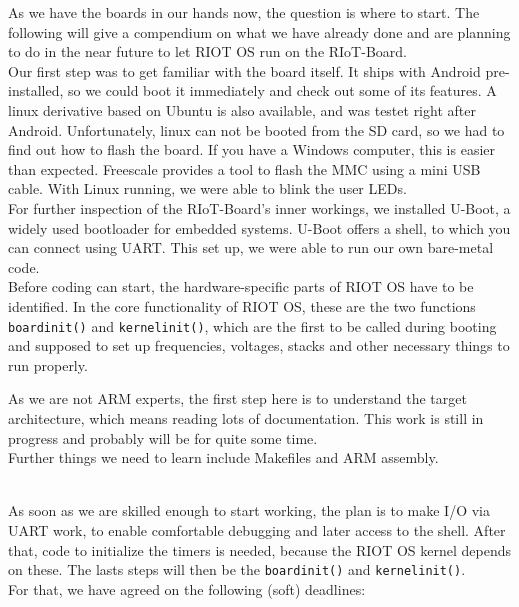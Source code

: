 \documentclass[conference,a4paper]{IEEEtran}
\begin{document}
As we have the boards in our hands now, the question is where to start. The 
following will give a compendium on what we have already done and are planning 
to do in the near future to let RIOT OS run on the RIoT-Board.\\
Our first step was to get familiar with the board itself. It ships with Android 
pre-installed, so we could boot it immediately and check out some of its 
features. A linux derivative based on Ubuntu is also available, and was testet 
right after Android. Unfortunately, linux can not be booted from the SD card, 
so we had to find out how to flash the board. If you have a Windows computer, 
this is easier than expected. Freescale provides a tool to flash the MMC using 
a mini USB cable. With Linux running, we were able to blink the user LEDs.\\
For further inspection of the RIoT-Board's inner workings, we installed U-Boot, 
a widely used bootloader for embedded systems. U-Boot offers a shell, to which 
you can connect using UART. This set up, we were able to run our own bare-metal 
code.\\

Before coding can start, the hardware-specific parts of RIOT OS have to be 
identified. In the core functionality of RIOT OS, these are the two functions 
\texttt{board\underbar{ }init()} and \texttt{kernel\underbar{ }init()}, which 
are the first to be called during booting and supposed to set up frequencies, 
voltages, stacks and other necessary things to run properly. \\

\newpage

As we are not ARM experts, the first step here is to understand the target 
architecture, which means reading lots of documentation. This work is still in 
progress and probably will be for quite some time.\\
Further things we need to learn include Makefiles and ARM assembly.\\ ~

As soon as we are skilled enough to start working, the plan is to make I/O via 
UART work, to enable comfortable debugging and later access to the shell. After 
that, code to initialize the timers is needed, because the RIOT OS kernel 
depends on these. The lasts steps will then be the \texttt{board\underbar{ 
}init()} and \texttt{kernel\underbar{ }init()}.\\

For that, we have agreed on the following (soft) deadlines:
\end{document}
